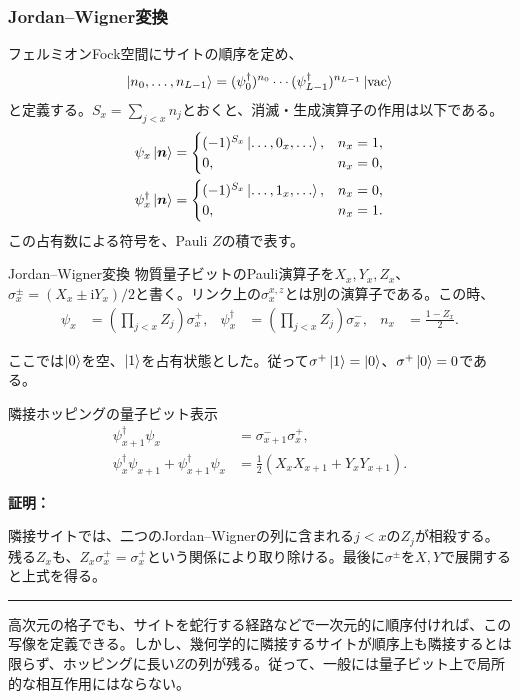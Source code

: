 \documentclass[a4paper,10.5pt]{article}
\numberwithin{equation}{section}
\providecommand{\ii}{\mathrm{i}}
\newenvironment{proofbox}
{\begin{prooflabel}\textbf{証明：}\end{prooflabel}\vspace{0.8em}}
{\par\vspace{1em}\hrule\vspace{1em}}
\begin{document}
\subsubsection{Jordan--Wigner変換}
フェルミオンFock空間にサイトの順序を定め、
\begin{align}
\ket{n_0,\ldots,n_{L-1}}
=(\psi_0^\dagger)^{n_0}\cdots
(\psi_{L-1}^\dagger)^{n_{L-1}}\ket{\mathrm{vac}}
\end{align}
と定義する。$S_x=\sum_{j<x}n_j$とおくと、消滅・生成演算子の作用は以下である。
\begin{align}
\psi_x\ket{\boldsymbol n}
&=\begin{cases}
(-1)^{S_x}\ket{\ldots,0_x,\ldots},&n_x=1,\\0,&n_x=0,
\end{cases}\\
\psi_x^\dagger\ket{\boldsymbol n}
&=\begin{cases}
(-1)^{S_x}\ket{\ldots,1_x,\ldots},&n_x=0,\\0,&n_x=1.
\end{cases}
\end{align}
この占有数による符号を、Pauli $Z$の積で表す。
\begin{defbox}{Jordan--Wigner変換}
物質量子ビットのPauli演算子を$X_x,Y_x,Z_x$、$\sigma_x^\pm=(X_x\pm\ii Y_x)/2$と書く。リンク上の$\sigma_x^{x,z}$とは別の演算子である。この時、
\begin{align}
\psi_x&=\left(\prod_{j<x}Z_j\right)\sigma_x^+,&
\psi_x^\dagger&=\left(\prod_{j<x}Z_j\right)\sigma_x^-,&
n_x&=\frac{1-Z_x}{2}.
\end{align}
\end{defbox}
ここでは$\ket0$を空、$\ket1$を占有状態とした。従って$\sigma^+\ket1=\ket0$、$\sigma^+\ket0=0$である。
\begin{resultbox}{隣接ホッピングの量子ビット表示}
\begin{align}
\psi_{x+1}^\dagger\psi_x&=\sigma_{x+1}^-\sigma_x^+,\\
\psi_x^\dagger\psi_{x+1}+\psi_{x+1}^\dagger\psi_x
&=\frac12(X_xX_{x+1}+Y_xY_{x+1}).
\end{align}
\end{resultbox}
\begin{proofbox}
隣接サイトでは、二つのJordan--Wignerの列に含まれる$j<x$の$Z_j$が相殺する。残る$Z_x$も、$Z_x\sigma_x^+=\sigma_x^+$という関係により取り除ける。最後に$\sigma^\pm$を$X,Y$で展開すると上式を得る。
\end{proofbox}
高次元の格子でも、サイトを蛇行する経路などで一次元的に順序付ければ、この写像を定義できる。しかし、幾何学的に隣接するサイトが順序上も隣接するとは限らず、ホッピングに長い$Z$の列が残る。従って、一般には量子ビット上で局所的な相互作用にはならない。
\end{document}
